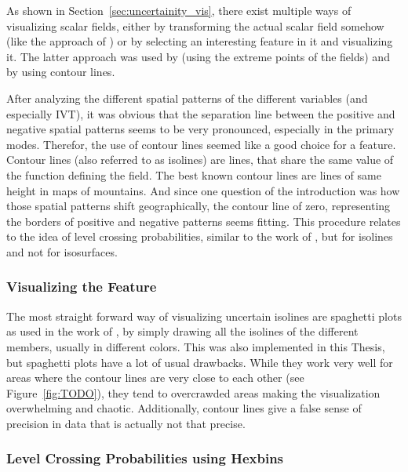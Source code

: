 As shown in Section~\ref{sec:uncertainity_vis}, there exist multiple ways of visualizing scalar fields, either by transforming the actual scalar field somehow (like the approach of ) or by selecting an interesting feature in it and visualizing it. 
The latter approach was used by   (using the extreme points of the fields) and by \cite{sanyal_noodles_2010, whitaker_contour_2013} using contour lines.  

After analyzing the different spatial patterns of the different variables (and especially IVT), it was obvious that the separation line between the positive and negative spatial patterns seems to be very pronounced, especially in the primary modes. 
Therefor, the use of contour lines seemed like a good choice for a feature. 
Contour lines (also referred to as isolines) are lines, that share the same value of the function defining the field. The best known contour lines are lines of same height in maps of mountains.  
And since one question of the introduction was how those spatial patterns shift geographically, the contour line of zero, representing the borders of positive and negative patterns seems fitting. 
This procedure relates to the idea of level crossing probabilities, similar to the work of , but for isolines and not for isosurfaces.

\subsubsection{Visualizing the Feature}

The most straight forward way of visualizing uncertain isolines are spaghetti plots as used in the work of , by simply drawing all the isolines of the different members, usually in different colors. 
This was also implemented in this Thesis, but spaghetti plots have a lot of usual drawbacks. 
While they work very well for areas where the contour lines are very close to each other (see Figure~\ref{fig:TODO}), they tend to overcrawded areas making the visualization overwhelming and chaotic. 
Additionally, contour lines give a false sense of precision in data that is actually not that precise. 

\subsubsection{Level Crossing Probabilities using Hexbins}

